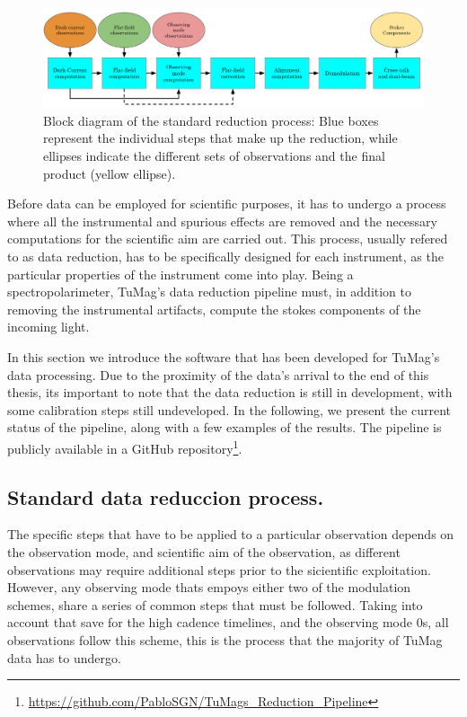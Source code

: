 \begin{figure}[t]
  \includegraphics[width=\textwidth]{figures/Pipeline/pipeline_diagram.PNG}
  \caption{
    Block diagram of the standard reduction process: Blue boxes represent the individual steps that make up the reduction, while ellipses indicate the different sets of observations and the final product (yellow ellipse). }
    \label{fig_pipeline: block_diagram}
\end{figure}

Before data can be employed for scientific purposes, it has to undergo a process where all the instrumental and spurious effects are removed and the necessary computations for the scientific aim are carried out. This process, usually refered to as data reduction, has to be specifically designed for each instrument, as the particular properties of the instrument come into play. Being a spectropolarimeter, TuMag's data reduction pipeline must, in addition to removing the instrumental artifacts, compute the stokes components of the incoming light.

In this section we introduce the software that has been developed for TuMag's data processing. Due to the proximity of the data's arrival to the end of this thesis, its important to note that the data reduction is still in development, with some calibration steps still undeveloped. In the following, we present the current status of the pipeline, along with a few examples of the results. The pipeline is publicly available in a GitHub repository\footnote{\url{https://github.com/PabloSGN/TuMags_Reduction_Pipeline}}.  

\subsection{Standard data reduccion process.}

The specific steps that have to be applied to a particular observation depends on the observation mode, and scientific aim of the observation, as different observations may require additional steps prior to the sicientific exploitation. However, any observing mode thats empoys either two of the modulation schemes, share a series of common steps that must be followed. Taking into account that save for the high cadence timelines, and the observing mode 0s, all observations follow this scheme, this is the process that the majority of TuMag data has to undergo. 

